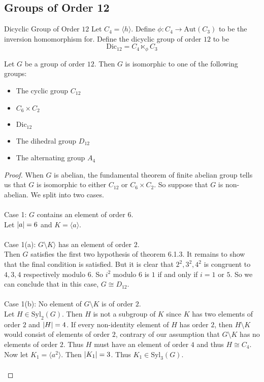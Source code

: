 \documentclass[a4paper]{article}
\begin{document}
\subsection{Groups of Order 12}
\begin{defn}{Dicyclic Group of Order $12$}{} Let $C_4=\langle h\rangle$. Define $\phi:C_4\to\text{Aut}(C_3)$ to be the inversion homomorphism for. Define the dicyclic group of order $12$ to be $$\text{Dic}_{12}=C_4\ltimes_\phi C_3$$ 
\end{defn}

\begin{thm}{}{} Let $G$ be a group of order $12$. Then $G$ is isomorphic to one of the following groups: 
\begin{itemize}
\item The cyclic group $C_{12}$
\item $C_6\times C_2$
\item $\text{Dic}_{12}$
\item The dihedral group $D_{12}$
\item The alternating group $A_4$
\end{itemize} \tcbline
\begin{proof}
When $G$ is abelian, the fundamental theorem of finite abelian group tells us that $G$ is isomorphic to either $C_{12}$ or $C_6\times C_2$. So suppose that $G$ is non-abelian. We split into two cases. \\~\\

Case 1: $G$ contains an element of order $6$. \\
Let $\abs{a}=6$ and $K=\langle a\rangle$. \\~\\

Case 1(a): $G\setminus K\rangle$ has an element of order $2$. \\
Then $G$ satisfies the first two hypothesis of theorem 6.1.3. It remains to show that the final condition is satisfied. But it is clear that $2^2,3^2,4^2$ is congruent to $4,3,4$ respectively modulo $6$. So $i^2$ modulo $6$ is $1$ if and only if $i=1$ or $5$. So we can conclude that in this case, $G\cong D_{12}$. \\~\\

Case 1(b): No element of $G\setminus K$ is of order $2$. \\
Let $H\in\text{Syl}_2(G)$. Then $H$ is not a subgroup of $K$ since $K$ has two elements of order $2$ and $\abs{H}=4$. If every non-identity element of $H$ has order $2$, then $H\setminus K$ would consist of elements of order $2$, contrary of our assumption that $G\setminus K$ has no elements of order $2$. Thus $H$ must have an element of order $4$ and thus $H\cong C_4$. Now let $K_1=\langle a^2\rangle$. Then $\abs{K_1}=3$. Thus $K_1\in\text{Syl}_3(G)$. \\~\\


\end{proof}
\end{thm}
\end{document}
